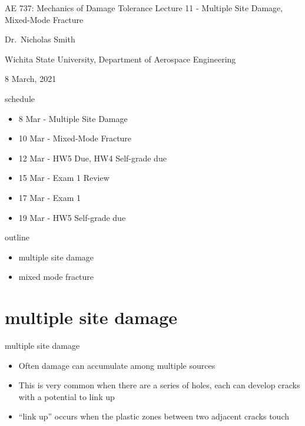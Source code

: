 \documentclass[
  letterpaper,
  ignorenonframetext,
  aspectratio=43,
  handout,
  12pt]{beamer}
\author{}
\date{}
\providecommand{\tightlist}{%
  \setlength{\itemsep}{0pt}\setlength{\parskip}{0pt}}
\providecommand{\tightlist}{%
\setlength{\itemsep}{0pt}\setlength{\parskip}{0pt}}
\begin{document}
\begin{frame}{AE 737: Mechanics of Damage Tolerance}
\protect\hypertarget{ae-737-mechanics-of-damage-tolerance}{}
Lecture 11 - Multiple Site Damage, Mixed-Mode Fracture

Dr.~Nicholas Smith

Wichita State University, Department of Aerospace Engineering

8 March, 2021
\end{frame}

\begin{frame}{schedule}
\protect\hypertarget{schedule}{}
\begin{itemize}
\tightlist
\item
  8 Mar - Multiple Site Damage
\item
  10 Mar - Mixed-Mode Fracture
\item
  12 Mar - HW5 Due, HW4 Self-grade due
\item
  15 Mar - Exam 1 Review
\item
  17 Mar - Exam 1
\item
  19 Mar - HW5 Self-grade due
\end{itemize}
\end{frame}

\begin{frame}{outline}
\protect\hypertarget{outline}{}
\begin{itemize}
\tightlist
\item
  multiple site damage
\item
  mixed mode fracture
\end{itemize}
\end{frame}

\hypertarget{multiple-site-damage}{%
\section{multiple site damage}\label{multiple-site-damage}}

\begin{frame}{multiple site damage}
\protect\hypertarget{multiple-site-damage-1}{}
\begin{itemize}
\tightlist
\item
  Often damage can accumulate among multiple sources
\item
  This is very common when there are a series of holes, each can develop
  cracks with a potential to link up
\item
  ``link up'' occurs when the plastic zones between two adjacent cracks
  touch
\end{itemize}
\end{frame}
\end{document}
